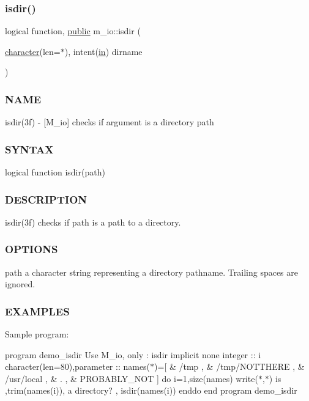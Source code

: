 \subsubsection{\texorpdfstring{isdir()}{isdir()}}
{\footnotesize\ttfamily logical function, \hyperlink{M__stopwatch_83_8txt_a2f74811300c361e53b430611a7d1769f}{public} m\+\_\+io\+::isdir (\begin{DoxyParamCaption}\item[{\hyperlink{option__stopwatch_83_8txt_abd4b21fbbd175834027b5224bfe97e66}{character}(len=$\ast$), intent(\hyperlink{M__journal_83_8txt_afce72651d1eed785a2132bee863b2f38}{in})}]{dirname }\end{DoxyParamCaption})}



\subsubsection*{N\+A\+ME}

isdir(3f) -\/ \mbox{[}M\+\_\+io\mbox{]} checks if argument is a directory path \subsubsection*{S\+Y\+N\+T\+AX}

logical function isdir(path) \subsubsection*{D\+E\+S\+C\+R\+I\+P\+T\+I\+ON}

isdir(3f) checks if path is a path to a directory. \subsubsection*{O\+P\+T\+I\+O\+NS}

path a character string representing a directory pathname. Trailing spaces are ignored. \subsubsection*{E\+X\+A\+M\+P\+L\+ES}

Sample program\+:

program demo\+\_\+isdir Use M\+\_\+io, only \+: isdir implicit none integer \+:\+: i character(len=80),parameter \+:\+: names($\ast$)=\mbox{[} \& \textquotesingle{}/tmp \textquotesingle{}, \& \textquotesingle{}/tmp/\+N\+O\+T\+T\+H\+E\+RE \textquotesingle{}, \& \textquotesingle{}/usr/local \textquotesingle{}, \& \textquotesingle{}. \textquotesingle{}, \& \textquotesingle{}P\+R\+O\+B\+A\+B\+L\+Y\+\_\+\+N\+OT \textquotesingle{}\mbox{]} do i=1,size(names) write($\ast$,$\ast$)\textquotesingle{} is \textquotesingle{},trim(names(i)),\textquotesingle{} a directory? \textquotesingle{}, isdir(names(i)) enddo end program demo\+\_\+isdir

